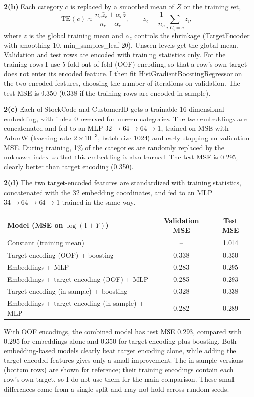 \documentclass[11pt]{article}
\begin{document}
\textbf{2(b)}
Each category $c$ is replaced by a smoothed mean of $Z$ on the training set,
\[
\mathrm{TE}(c)\approx\frac{n_c\bar z_c+\alpha_c\bar z}{n_c+\alpha_c},\qquad \bar z_c=\frac1{n_c}\sum_{i:C_i=c}z_i,
\]
where $\bar z$ is the global training mean and $\alpha_c$ controls the shrinkage (TargetEncoder with smoothing 10, min\_samples\_leaf 20). Unseen levels get the global mean. Validation and test rows are encoded with training statistics only. For the training rows I use 5-fold out-of-fold (OOF) encoding, so that a row's own target does not enter its encoded feature. I then fit HistGradientBoostingRegressor on the two encoded features, choosing the number of iterations on validation. The test MSE is 0.350 (0.338 if the training rows are encoded in-sample).

\textbf{2(c)}
Each of StockCode and CustomerID gets a trainable 16-dimensional embedding, with index 0 reserved for unseen categories. The two embeddings are concatenated and fed to an MLP $32\to64\to64\to1$, trained on MSE with AdamW (learning rate $2\times10^{-3}$, batch size 1024) and early stopping on validation MSE. During training, 1\% of the categories are randomly replaced by the unknown index so that this embedding is also learned. The test MSE is 0.295, clearly better than target encoding (0.350).

\textbf{2(d)}
The two target-encoded features are standardized with training statistics, concatenated with the 32 embedding coordinates, and fed to an MLP $34\to64\to64\to1$ trained in the same way.

\begin{center}
\begin{tabular}{lcc}
\toprule
Model (MSE on $\log(1+Y)$) & Validation MSE & Test MSE\\
\midrule
Constant (training mean) & -- & 1.014\\
Target encoding (OOF) + boosting & 0.338 & 0.350\\
Embeddings + MLP & 0.283 & 0.295\\
Embeddings + target encoding (OOF) + MLP & 0.285 & 0.293\\
\midrule
Target encoding (in-sample) + boosting & 0.328 & 0.338\\
Embeddings + target encoding (in-sample) + MLP & 0.282 & 0.289\\
\bottomrule
\end{tabular}
\end{center}

With OOF encodings, the combined model has test MSE 0.293, compared with 0.295 for embeddings alone and 0.350 for target encoding plus boosting. Both embedding-based models clearly beat target encoding alone, while adding the target-encoded features gives only a small improvement. The in-sample versions (bottom rows) are shown for reference; their training encodings contain each row's own target, so I do not use them for the main comparison. These small differences come from a single split and may not hold across random seeds.
\end{document}

